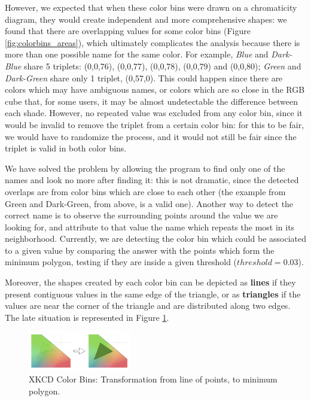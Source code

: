 %
However, we expected that when these color bins were drawn on a chromaticity diagram, they would create independent and more comprehensive shapes: we found that there are overlapping
values for some color bins (Figure \ref{fig:colorbins_areas}), which ultimately complicates the analysis because there is more than one possible name for the same color. For example, \emph{Blue} and \emph{Dark-Blue}
share 5 triplets: (0,0,76), (0,0,77), (0,0,78), (0,0,79) and (0,0,80); \emph{Green} and \emph{Dark-Green} share only 1 triplet, (0,57,0). This could happen since there are colors which may have ambiguous names, or
colors which are so close in the RGB cube that, for some users, it may be almost undetectable the difference between each shade. However, no repeated value was excluded from any color bin, since it would be invalid to
remove the triplet from a certain color bin: for this to be fair, we would have to randomize the process, and it would not still be fair since the triplet is valid in both color bins. \par
%
We have solved the problem by allowing the program to find only one of the names and look no more after finding it: this is not dramatic, since the detected overlaps are from color bins which are close to each other
(the example from Green and Dark-Green, from above, is a valid one). Another way to detect the correct name is to observe the surrounding points around the value we are looking for, and attribute to that value the name
which repeats the most in its neighborhood. Currently, we are detecting the color bin which could be associated to a given value by comparing the answer with the points which form the
minimum polygon, testing if they are inside a given threshold ($threshold = 0.03$). \par
%
Moreover, the shapes created by each color bin can be depicted as \textbf{lines} if they present contiguous values in the same edge of the triangle, or as \textbf{triangles}
if the values are near the corner of the triangle and are distributed along two edges. The late situation is represented in Figure \ref{fig:colorbins_triangle}.
%
\begin{figure}
  \centering
  \includegraphics[width=0.4\textwidth]{images/results/colorbins_transformation.png}
  \caption[XKCD Color Survey: Color Bins Transformation]{XKCD Color Bins: Transformation from line of points, to minimum polygon.}
  \label{fig:colorbins_triangle}
\end{figure} \par
